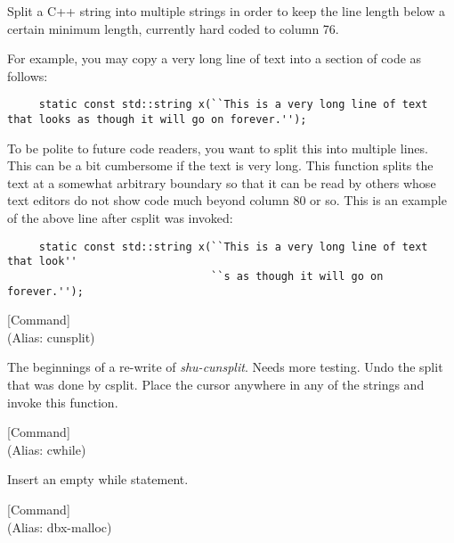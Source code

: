 \begin{doc-string}
Split a C++ string into multiple strings in order to keep the line length
below a certain minimum length, currently hard coded to column 76.

For example, you may copy a very long line of text into a section of code as
follows:

\small{\begin{verbatim}
     static const std::string x(``This is a very long line of text that looks as though it will go on forever.'');
\end{verbatim}}

To be polite to future code readers, you want to split this into multiple lines.
This can be a bit cumbersome if the text is very long.  This function splits the
text at a somewhat arbitrary boundary so that it can be read by others whose
text editors do not show code much beyond column 80 or so.  This is an example
of the above line after csplit was invoked:

\small{\begin{verbatim}
     static const std::string x(``This is a very long line of text that look''
                                ``s as though it will go on forever.'');
\end{verbatim}}
\end{doc-string}

\vspace{1em}
\noindent
{}
\usebox{\funcname}
 \hfill [Command]\\%
 (Alias: cunsplit)

\begin{doc-string}
The beginnings of a re-write of \emph{shu-cunsplit}.
Needs more testing.
Undo the split that was done by csplit.  Place the cursor anywhere
in any of the strings and invoke this function.
\end{doc-string}

\vspace{1em}
\noindent
{}
\usebox{\funcname}
 \hfill [Command]\\%
 (Alias: cwhile)

\begin{doc-string}
Insert an empty while statement.
\end{doc-string}

\vspace{1em}
\noindent
{}
\usebox{\funcname}
 \hfill [Command]\\%
 (Alias: dbx-malloc)

